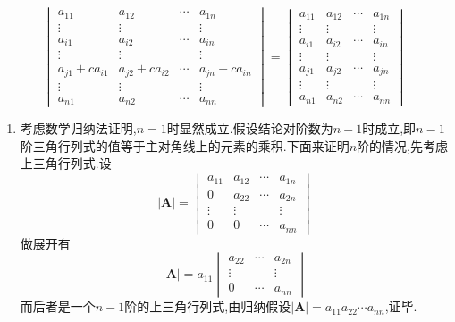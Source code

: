 \begin{formal}
\begin{proposition}[行列式的性质]
\begin{enumerate}[label = {\textup{(\arabic*)}}]
        \[
        \begin{vmatrix}
            a_{11}&a_{12}&\cdots&a_{1n}\\
            \vdots&\vdots& &\vdots\\
            a_{i1}&a_{i2}&\cdots&a_{in}\\
            \vdots&\vdots& &\vdots\\
            a_{j1}+ca_{i1}&a_{j2}+ca_{i2}&\cdots&a_{jn}+ca_{in}\\
            \vdots&\vdots& &\vdots\\
            a_{n1}&a_{n2}&\cdots&a_{nn}
        \end{vmatrix}=
        \begin{vmatrix}
            a_{11}&a_{12}&\cdots&a_{1n}\\
            \vdots&\vdots& &\vdots\\
            a_{i1}&a_{i2}&\cdots&a_{in}\\
            \vdots&\vdots& &\vdots\\
            a_{j1}&a_{j2}&\cdots&a_{jn}\\
            \vdots&\vdots& &\vdots\\
            a_{n1}&a_{n2}&\cdots&a_{nn}
        \end{vmatrix}
        \]
    \end{enumerate}
\end{proposition}
\begin{Proof}
\begin{enumerate}[label = {\textup{(\arabic*)}}]
    \item 考虑数学归纳法证明,$n=1$时显然成立.假设结论对阶数为$n-1$时成立,即$n-1$阶三角行列式的值等于主对角线上的元素的乘积.下面来证明$n$阶的情况,先考虑上三角行列式.设\[
    \left|\bm{A}\right|=\begin{vmatrix}
        a_{11} & a_{12} & \cdots & a_{1n} \\
        0 & a_{22} & \cdots & a_{2n} \\
        \vdots & \vdots &  & \vdots \\
        0 & 0 & \cdots & a_{nn}
    \end{vmatrix}
    \]做展开有\[
    \left|\bm{A}\right|=a_{11}\begin{vmatrix}
        a_{22} & \cdots & a_{2n} \\
        \vdots &  & \vdots \\
        0& \cdots & a_{nn}
    \end{vmatrix}
    \]而后者是一个$n-1$阶的上三角行列式,由归纳假设$\left|\bm{A}\right|=a_{11}a_{22}\cdots a_{nn}$,证毕.
    

\end{enumerate}
\end{Proof}
\end{formal}
